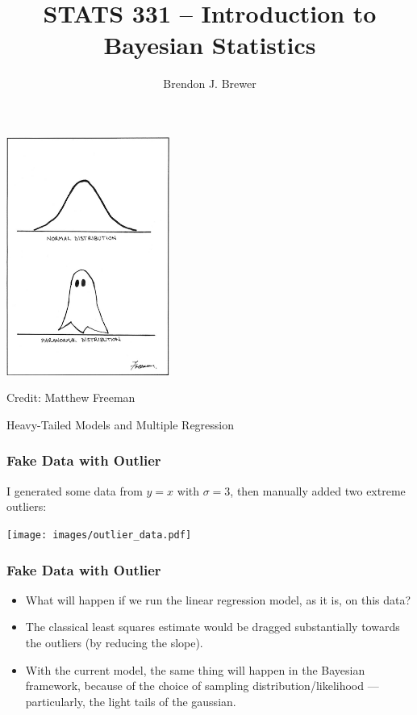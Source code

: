 \documentclass{beamer}
\author{Brendon J. Brewer}
\title{STATS 331 -- Introduction to Bayesian Statistics}
\institute{The University of Auckland}
\date{}
\begin{document}
\frame{\titlepage}

\begin{frame}
\begin{center}
\includegraphics[width=0.4\textwidth]{images/paranormal.png}

Credit: Matthew Freeman
\end{center}

\end{frame}



\begin{frame}
\centering
\large
Heavy-Tailed Models and Multiple Regression

\end{frame}


\begin{frame}
\frametitle{Fake Data with Outlier}
I generated some data from $y=x$ with $\sigma=3$, then manually added two
extreme outliers:

\begin{center}
\texttt{[image: images/outlier\_data.pdf]}
\end{center}

\end{frame}

\begin{frame}
\frametitle{Fake Data with Outlier}
\begin{itemize}
\item What will happen if we run the linear regression model, as it is, on this
data? \pause
\item The classical least squares estimate would be dragged substantially towards
the outliers (by reducing the slope).\pause
\item With the current model, the same thing will happen in the Bayesian framework,
because of the choice of sampling distribution/likelihood --- particularly,
the light tails of the gaussian.
\end{itemize}
\end{frame}
\end{document}
